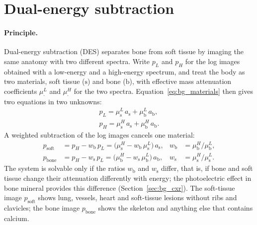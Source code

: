 \section{Dual-energy subtraction}
\label{sec:bg_des}
\paragraph{Principle.} Dual-energy subtraction (DES) separates bone from soft tissue by imaging the same anatomy with two different spectra.
Write $p_L$ and $p_H$ for the log images obtained with a low-energy and a high-energy spectrum, and treat the body as two materials, soft tissue
($\mathrm{s}$) and bone ($\mathrm{b}$), with effective mass attenuation coefficients $\mu^{L}_{\cdot}$ and $\mu^{H}_{\cdot}$ for the two spectra.
Equation~\eqref{eq:bg_materials} then gives two equations in two unknowns:
\begin{equation}
\begin{gathered}
p_L=\mu^{L}_{\mathrm{s}}\,a_{\mathrm{s}}+\mu^{L}_{\mathrm{b}}\,a_{\mathrm{b}},\\
p_H=\mu^{H}_{\mathrm{s}}\,a_{\mathrm{s}}+\mu^{H}_{\mathrm{b}}\,a_{\mathrm{b}} .
\end{gathered}
\label{eq:bg_des_system}
\end{equation}
A weighted subtraction of the log images cancels one material:
\begin{align}
p_{\mathrm{soft}} &= p_H-w_{\mathrm{b}}\,p_L=\big(\mu^{H}_{\mathrm{s}}-w_{\mathrm{b}}\,\mu^{L}_{\mathrm{s}}\big)\,a_{\mathrm{s}},
 & w_{\mathrm{b}}&=\mu^{H}_{\mathrm{b}}/\mu^{L}_{\mathrm{b}}, \label{eq:bg_des_soft}\\
p_{\mathrm{bone}} &= p_H-w_{\mathrm{s}}\,p_L=\big(\mu^{H}_{\mathrm{b}}-w_{\mathrm{s}}\,\mu^{L}_{\mathrm{b}}\big)\,a_{\mathrm{b}},
 & w_{\mathrm{s}}&=\mu^{H}_{\mathrm{s}}/\mu^{L}_{\mathrm{s}}. \label{eq:bg_des_bone}
\end{align}
The system is solvable only if the ratios $w_{\mathrm{b}}$ and $w_{\mathrm{s}}$ differ, that is, if bone and soft tissue change their attenuation
differently with energy; the photoelectric effect in bone mineral provides this difference (Section~\ref{sec:bg_cxr}). The soft-tissue image
$p_{\mathrm{soft}}$ shows lung, vessels, heart and soft-tissue lesions without ribs and clavicles; the bone image $p_{\mathrm{bone}}$ shows the
skeleton and anything else that contains calcium.

